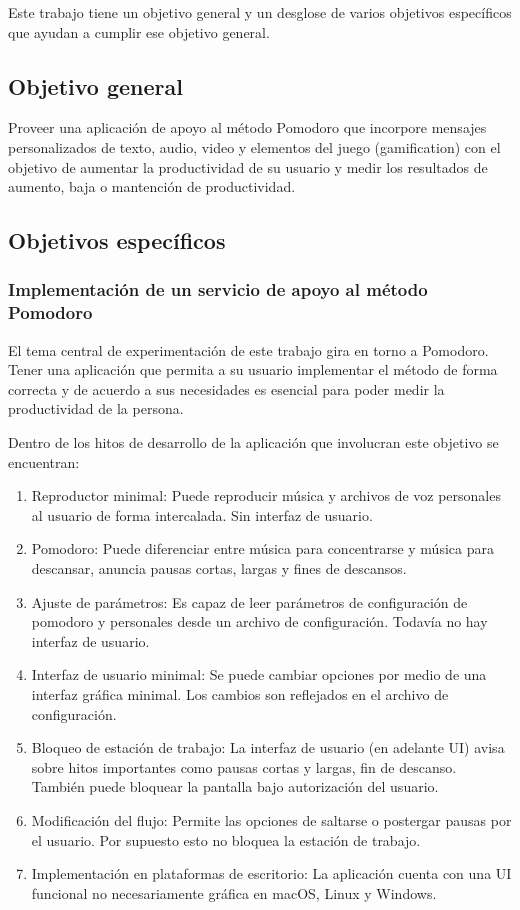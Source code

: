 \documentclass[12pt,letterpaper]{report}
\providecommand{\tightlist}{%
  \setlength{\itemsep}{0pt}\setlength{\parskip}{0pt}}
\begin{document}
Este trabajo tiene un objetivo general y un desglose de varios objetivos específicos que ayudan a cumplir ese objetivo
general.

\subsection{Objetivo general}\label{objetivo-general}

Proveer una aplicación de apoyo al método Pomodoro que incorpore mensajes personalizados de texto, audio, video y
elementos del juego (gamification) con el objetivo de aumentar la productividad de su usuario y medir los resultados de
aumento, baja o mantención de productividad.

\subsection{Objetivos específicos}\label{objetivos-especificos}

\subsubsection{Implementación de un servicio de apoyo al método Pomodoro}\label{implementacion-de-un-servicio-de-apoyo-a-pomodoro}

El tema central de experimentación de este trabajo gira en torno a Pomodoro. Tener una aplicación que permita a su
usuario implementar el método de forma correcta y de acuerdo a sus necesidades es esencial para poder medir la
productividad de la persona.

Dentro de los hitos de desarrollo de la aplicación que involucran este objetivo se encuentran:

\begin{enumerate}\tightlist{}
  \item Reproductor minimal: Puede reproducir música y archivos de voz personales al usuario de forma intercalada. Sin
    interfaz de usuario.
  \item Pomodoro: Puede diferenciar entre música para concentrarse y música para descansar, anuncia pausas cortas,
    largas y fines de descansos.
  \item Ajuste de parámetros: Es capaz de leer parámetros de configuración de pomodoro y personales desde un archivo de
    configuración. Todavía no hay interfaz de usuario.
  \item Interfaz de usuario minimal: Se puede cambiar opciones por medio de una interfaz gráfica minimal. Los cambios
    son reflejados en el archivo de configuración.
  \item Bloqueo de estación de trabajo: La interfaz de usuario (en adelante UI) avisa sobre hitos importantes como
    pausas cortas y largas, fin de descanso. También puede bloquear la pantalla bajo autorización del usuario.
  \item Modificación del flujo: Permite las opciones de saltarse o postergar pausas por el usuario. Por supuesto esto no
    bloquea la estación de trabajo.
  \item Implementación en plataformas de escritorio: La aplicación cuenta con una UI funcional no necesariamente gráfica
    en macOS, Linux y Windows.
\end{enumerate}
\end{document}
